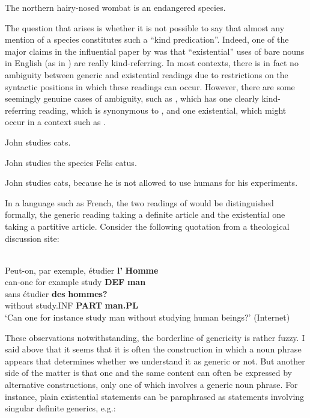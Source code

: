 \ea
\gl The northern hairy-nosed wombat is an endangered species. 
\z 

The question that arises is whether it is not possible to say that almost any mention of a species constitutes such a “kind predication”. Indeed, one of the major claims in the influential paper by \citet{Carlson1977} was that “existential” uses of bare nouns in English (as in ) are really kind-referring. In most contexts, there is in fact no ambiguity between generic and existential readings due to restrictions on the syntactic positions in which these readings can occur. However, there are some seemingly genuine cases of ambiguity, such as , which has one clearly kind-referring reading, which is synonymous to , and one existential, which might occur in a context such as .

\ea
\gl \label{bkm:Ref107049066}John studies cats.  
 \z

\ea 
\gl \label{bkm:Ref107049087}John studies the species Felis catus.
\z 

\ea 
\gl \label{bkm:Ref107049114}John studies cats, because he is not allowed to use humans for his experiments. 
\z 

In a language such as French, the two readings of  would be distinguished formally, the generic reading taking a definite article and the existential one taking a partitive article. Consider the following quotation from a theological discussion site:

\ea \label{} 
\\
\gll Peut-on,  par  exemple,  étudier  \textbf{l’} \textbf{ Homme}\\
can-one  for  example  study  \textbf{DEF } \textbf{man}\\
\gll sans  étudier  \textbf{des} \textbf{hommes?} \\
without  study.INF  \textbf{PART} \textbf{man.PL} \\
\glt ‘Can one for instance study man without studying human beings?’ (Internet)

\z

These observations notwithstanding, the borderline of genericity is rather fuzzy. I said above that it seems that it is often the construction in which a noun phrase appears that determines whether we understand it as generic or not. But another side of the matter is that one and the same content can often be expressed by alternative constructions, only one of which involves a generic noun phrase. For instance, plain existential statements can be paraphrased as statements involving singular definite generics, e.g.:

